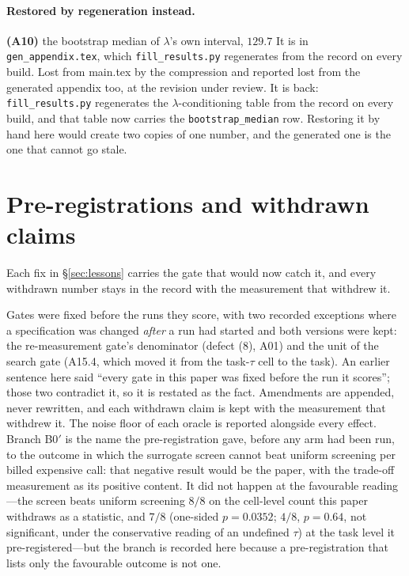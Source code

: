 \documentclass{article}
\begin{document}
\paragraph{Restored by regeneration instead.}
\textbf{(A10)} the bootstrap median of $\lambda$'s own interval, $129.7$  It is in \texttt{gen\_appendix.tex}, which \texttt{fill\_results.py} regenerates from
the record on every build.  Lost from main.tex by the compression and reported lost from the generated appendix too, at the revision under review.  It is back: \texttt{fill\_results.py} regenerates the $\lambda$-conditioning table from the record on every build, and that table now carries the \texttt{bootstrap\_median} row.  Restoring it by hand here would create two copies of one number, and the generated one is the one that cannot go stale.

\section{Pre-registrations and withdrawn claims}
Each fix in \S\ref{sec:lessons} carries the gate that would now catch it, and every withdrawn number stays in the record with the measurement that withdrew it.

Gates were fixed before the runs they score, with two recorded exceptions where a
specification was changed \emph{after} a run had started and both versions were kept:
the re-measurement gate's denominator (defect (8), A01) and the unit of
the search gate (A15.4, which moved it from the task-$\tau$ cell to the task).  An
earlier sentence here said ``every gate in this paper was fixed before the run it
scores''; those two contradict it, so it is restated as the fact.  Amendments are
appended, never rewritten, and each withdrawn claim is kept with the measurement that
withdrew it.  The noise floor of each oracle is reported alongside every
effect.  Branch B0$'$ is the name the pre-registration gave, before any arm had been run, to the
outcome in which the surrogate screen cannot beat uniform screening per billed expensive
call: that negative result would be the paper, with the trade-off measurement as its
positive content.  It did not happen at the favourable reading---the screen beats
uniform screening $8/8$ on the cell-level count this paper withdraws as a statistic, and
$7/8$ (one-sided $p = 0.0352$; $4/8$, $p = 0.64$, not significant, under the conservative
reading of an undefined $\tau$) at the task level it pre-registered---but the
branch is recorded here because a pre-registration that lists only the favourable outcome
is not one.
\end{document}
